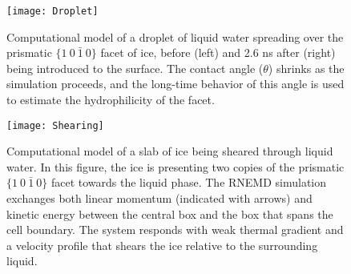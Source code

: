 \documentclass{pnastwo}
\begin{document}
\begin{figure}
\texttt{[image: Droplet]}
\caption{\label{fig:Droplet} Computational model of a droplet of
  liquid water spreading over the prismatic $\{1~0~\bar{1}~0\}$ facet
  of ice, before (left) and 2.6 ns after (right) being introduced to the
  surface.  The contact angle ($\theta$) shrinks as the simulation
  proceeds, and the long-time behavior of this angle is used to
  estimate the hydrophilicity of the facet.}
\end{figure}

\begin{figure}
\texttt{[image: Shearing]}
\caption{\label{fig:Shearing} Computational model of a slab of ice
  being sheared through liquid water.  In this figure, the ice is
  presenting two copies of the prismatic $\{1~0~\bar{1}~0\}$ facet
  towards the liquid phase.  The RNEMD simulation exchanges both
  linear momentum (indicated with arrows) and kinetic energy between
  the central box and the box that spans the cell boundary.  The
  system responds with weak thermal gradient and a velocity profile
  that shears the ice relative to the surrounding liquid.}
\end{figure}


\end{document}
